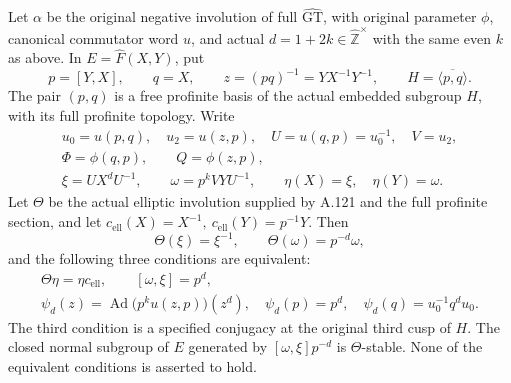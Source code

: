 Let \(\alpha\) be the original negative involution of full
\(\widehat{\mathrm{GT}}\), with original parameter \(\phi\), canonical
commutator word \(u\), and actual \(d=1+2k\in\widehat{\mathbb Z}^{\times}\)
with the same even \(k\) as above. In \(E=\widehat F(X,Y)\), put
\[
 p=[Y,X],\qquad q=X,\qquad z=(pq)^{-1}=YX^{-1}Y^{-1},\qquad
 H=\overline{\langle p,q\rangle}.
                                                                    \tag{A.122.1}
\]
The pair \((p,q)\) is a free profinite basis of the actual embedded
subgroup \(H\), with its full profinite topology.
Write
\[
 \begin{gathered}
 u_0=u(p,q),\quad u_2=u(z,p),\quad U=u(q,p)=u_0^{-1},\quad V=u_2,\\
 \Phi=\phi(q,p),\qquad Q=\phi(z,p),\\
 \xi=U X^dU^{-1},\qquad
 \omega=p^kVYU^{-1},\qquad \eta(X)=\xi,\quad\eta(Y)=\omega .
 \end{gathered}                                                     \tag{A.122.2}
\]
Let \(\Theta\) be the actual elliptic involution supplied by A.121
and the full profinite section, and let
\(c_{\mathrm{ell}}(X)=X^{-1},\
c_{\mathrm{ell}}(Y)=p^{-1}Y\).
Then
\[
 \Theta(\xi)=\xi^{-1},\qquad \Theta(\omega)=p^{-d}\omega,       \tag{A.122.3}
\]
and the following three conditions are equivalent:
\[
 \begin{gathered}
 \Theta\eta=\eta c_{\mathrm{ell}},\qquad
 [\omega,\xi]=p^d,\\
 \psi_d(z)=\operatorname{Ad}\bigl(p^ku(z,p)\bigr)(z^d),
 \quad
 \psi_d(p)=p^d,\quad\psi_d(q)=u_0^{-1}q^du_0 .
 \end{gathered}                                                     \tag{A.122.4}
\]
The third condition is a specified conjugacy at the original third
cusp of \(H\). The closed normal subgroup of \(E\) generated by
\([\omega,\xi]p^{-d}\) is \(\Theta\)-stable. None of the equivalent
conditions is asserted to hold.

